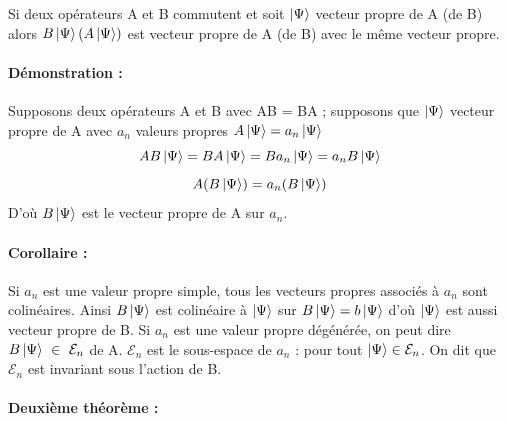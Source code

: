 \documentclass[12pt,a4paper,titlepage]{book}
\begin{document}
Si deux opérateurs A et B commutent et soit $\ket{\Psi}$ vecteur propre de A (de B) alors $B \ket \Psi (A \ket \Psi)$ est vecteur propre de A (de B) avec le même vecteur propre.

\paragraph*{Démonstration :}

Supposons deux opérateurs A et B avec AB = BA ; supposons que $\ket \Psi$ vecteur propre de A avec $a_n$ valeurs propres $A \ket \Psi = a_n \ket \Psi$
\begin{equation*}
AB \ket \Psi = BA \ket \Psi = B a_n \ket \Psi = a_n B \ket \Psi
\end{equation*}
\begin{equation*}
A(B \ket \Psi) = a_n (B \ket \Psi )
\end{equation*}
D'où $B \ket \Psi$ est le vecteur propre de A sur $a_n$.

\paragraph*{Corollaire :}

Si $a_n$ est une valeur propre simple, tous les vecteurs propres associés à $a_n$ sont colinéaires. Ainsi $B \ket \Psi$ est colinéaire à $\ket \Psi$ sur $B \ket \Psi = b \ket \Psi$ d'où $\ket \Psi$ est aussi vecteur propre de B. Si $a_n$ est une valeur propre dégénérée, on peut dire $B \ket \Psi ~\in~ \mathcal{E}_n$ de A. $\mathcal{E}_n$ est le sous-espace de $a_n$ : pour tout $\ket \Psi \in \mathcal{E}_n$. On dit que $\mathcal{E}_n$ est invariant sous l'action de B.

\paragraph*{Deuxième théorème :}
\end{document}
